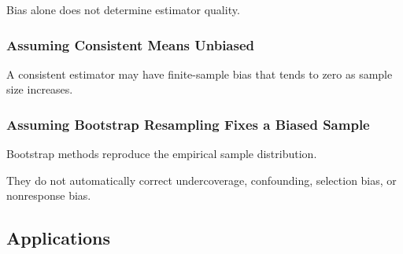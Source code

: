 Bias alone does not determine estimator quality.

\subsubsection{Assuming Consistent Means Unbiased}

A consistent estimator may have finite-sample bias that tends to zero as
sample size increases.

\subsubsection{Assuming Bootstrap Resampling Fixes a Biased Sample}

Bootstrap methods reproduce the empirical sample distribution.

They do not automatically correct undercoverage, confounding, selection
bias, or nonresponse bias.

\subsection{Applications}
\label{subsec:sampling-distribution-applications}


